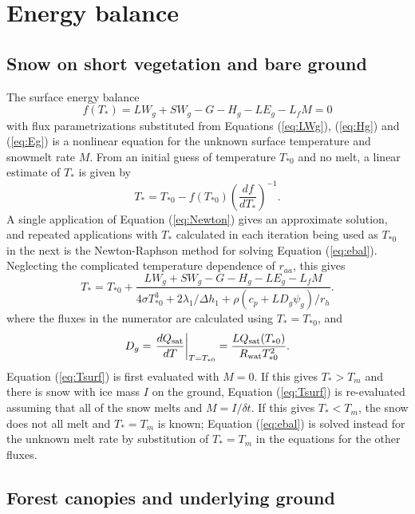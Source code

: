 \documentclass{article}
\begin{document}
\section{Energy balance}

\subsection{Snow on short vegetation and bare ground}

The surface energy balance
\begin{equation}
f(T_*) = LW_g + SW_g - G - H_g - LE_g - L_fM = 0
\label{eq:ebal}
\end{equation}
with flux parametrizations substituted from Equations (\ref{eq:LWg}), (\ref{eq:Hg}) and (\ref{eq:Eg}) is a nonlinear equation for the unknown surface temperature and snowmelt rate $M$. From an initial guess of temperature $T_{*0}$ and no melt, a linear estimate of $T_*$ is given by
\begin{equation}
T_* = T_{*0} - f(T_{*0})\left(\frac{df}{dT_*}\right)^{-1}.
\label{eq:Newton}
\end{equation}
A single application of Equation (\ref{eq:Newton}) gives an approximate solution, and repeated applications with $T_*$ calculated in each iteration being used as $T_{*0}$ in the next is the Newton-Raphson method for solving Equation (\ref{eq:ebal}). Neglecting the complicated temperature dependence of $r_{aa}$, this gives
\begin{equation}
T_* = T_{*0} + \frac{LW_g + SW_g - G - H_g - LE_g - L_fM}
                    {4\sigma T_{*0}^3 + 2\lambda_1/\Delta h_1
                                      + \rho(c_p + LD_g\psi_g)/r_h}.
\label{eq:Tsurf}
\end{equation}
where the fluxes in the numerator are calculated using $T_* = T_{*0}$, and
\begin{equation}
D_g = \left.\frac{dQ_{\rm sat}}{dT}\right\rvert_{T=T_{*0}} 
    = \frac{LQ_{\rm sat}(T_{*0})}{R_{\rm wat}T_{*0}^2}.
\end{equation}
Equation (\ref{eq:Tsurf}) is first evaluated with $M=0$. If this gives $T_* > T_m$ and there is snow with ice mass $I$ on the ground, Equation (\ref{eq:Tsurf}) is re-evaluated assuming that all of the snow melts and $M = I / \delta t$. If this gives $T_* < T_m$, the snow does not all melt and $T_* = T_m$ is known; Equation (\ref{eq:ebal}) is solved instead for the unknown melt rate by substitution of $T_* = T_m$ in the equations for the other fluxes.

\subsection{Forest canopies and underlying ground}
\end{document}
